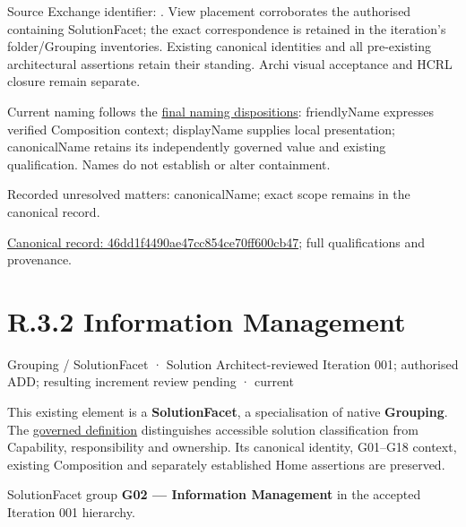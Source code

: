 Source Exchange identifier: \texttt{}. View placement corroborates
the authorised containing SolutionFacet; the exact correspondence is retained in the
iteration's folder/Grouping inventories. Existing canonical identities and all
pre-existing architectural assertions retain their standing. Archi visual
acceptance and HCRL closure remain separate.



Current naming follows the \href{\detokenize{../../../../../../../governance/canonical-identity-and-naming.md#solutionfacet-naming-roles--dr-17-final-dispositions}}{final naming dispositions}: friendlyName expresses verified Composition context; displayName supplies local presentation; canonicalName retains its independently governed value and existing qualification. Names do not establish or alter containment.


{\small Recorded unresolved matters: canonicalName; exact scope remains in the canonical record.}\par
{\footnotesize \href{../../../../../../../continuum/grouping/46dd1f4490ae47cc854ce70ff600cb47.md}{Canonical record: 46dd1f4490ae47cc854ce70ff600cb47}; full qualifications and provenance.}\par
\section*{R.3.2 Information Management}
\label{navigation:R.3.2}

\label{element:ef296738e68e4206a507dc3c811b3fe1}
{\small Grouping / SolutionFacet · Solution Architect-reviewed Iteration 001; authorised ADD; resulting increment review pending · current}\par

This existing element is a \textbf{SolutionFacet}, a specialisation of native
\textbf{Grouping}. The \href{\detokenize{../../../../../../../governance/continuum-representation.md#solutionfacet-classification--1119-candidate}}{governed definition}
distinguishes accessible solution classification from Capability, responsibility
and ownership. Its canonical identity, G01–G18 context, existing Composition
and separately established Home assertions are preserved.



SolutionFacet group \textbf{G02 — Information Management} in the accepted Iteration 001 hierarchy.



